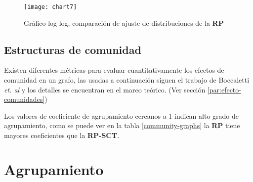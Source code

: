 \begin{figure}[ht]
\caption{Gráfico log-log, comparación de ajuste de distribuciones de la \textbf{\acrshort{RP}}}
\label{fig:ajusteDistribucionesRP}
\centering
\texttt{[image: chart7]}
\end{figure}


\subsection{Estructuras de comunidad}
Existen diferentes métricas para evaluar cuantitativamente los efectos de comunidad en un grafo, las usadas  a continuación siguen el trabajo de Boccaletti \textit{et. al}\cite{BOCCALETTI2006} y los detalles se encuentran en el marco teórico. (Ver sección \ref{par:efecto-comunidades})

\begin{table}[htb]
\centering
\caption{Métricas de efectos de comunidad en redes}
\label{community-graphs}
\end{table}

Los valores de coeficiente de agrupamiento cercanos a 1 indican alto grado de agrupamiento, como se puede ver en la tabla \ref{community-graphs} la \textbf{\acrshort{RP}} tiene mayores coeficientes que la \textbf{\acrshort{RP-SCT}}. 

\section{Agrupamiento}

